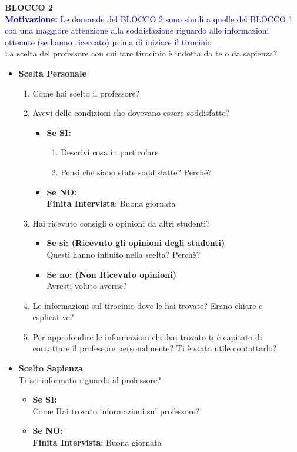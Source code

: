 \textbf{BLOCCO 2}\\
\textcolor{darkblue}{\textbf{Motivazione:} Le domande del BLOCCO 2 sono simili a quelle del BLOCCO 1
con una maggiore attenzione alla soddisfazione riguardo alle informazioni ottenute (se hanno ricercato) prima di iniziare il tirocinio}\\
La scelta del professore con cui fare tirocinio è indotta da te o da sapienza?
\begin{itemize}
    \item \textbf{Scelta Personale}
    \begin{enumerate}
        \item Come hai scelto il professore?
        \item Avevi delle condizioni che dovevano essere soddisfatte?
        \begin{itemize}
            \item \textbf{Se SI:}
            \begin{enumerate}
                \item Descrivi cosa in particolare
                \item Pensi che siano state soddisfatte? Perché?
            \end{enumerate}
            \item \textbf{Se NO:}\\
            \textbf{Finita Intervista}: Buona giornata
        \end{itemize}
        \item Hai ricevuto consigli o opinioni da altri studenti?
        \begin{itemize}
            \item \textbf{Se si: (Ricevuto gli opinioni degli studenti)}\\
            Questi hanno influito nella scelta? Perchè?
            \item \textbf{Se no: (Non Ricevuto opinioni)}\\
            Avresti voluto averne?
        \end{itemize}
        \item Le informazioni sul tirocinio dove le hai trovate? Erano chiare e esplicative?
        \item Per approfondire le informazioni che hai trovato ti è capitato di contattare il  professore personalmente? Ti è stato utile contattarlo?
    \end{enumerate}

    \item \textbf{Scelto Sapienza}\\
    Ti sei informato riguardo al professore?
    \begin{itemize}
        \item \textbf{Se SI:}\\
        Come Hai trovato informazioni sul professore?
        \item \textbf{Se NO:}\\
        \textbf{Finita Intervista}: Buona giornata
    \end{itemize}
\end{itemize}

